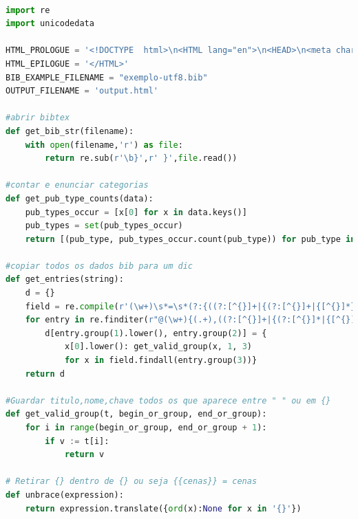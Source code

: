 \documentclass[11pt,a4paper]{report}
\begin{document}
\begin{lstlisting}[language=python]

import re
import unicodedata

HTML_PROLOGUE = '<!DOCTYPE  html>\n<HTML lang="en">\n<HEAD>\n<meta charset="utf-8">\n      <TITLE>Categories in BibTeX</TITLE>\n <script type="text/x-mathjax-config"> MathJax.Hub.Config({"extensions":["tex2jax.js"],"jax":["input/TeX","output/HTML-CSS"],"messageStyle":"none","tex2jax":{"processEnvironments":false,"processEscapes":true,"inlineMath":[["$","$"],["\\(","\\)"]],"displayMath":[["$$","$$"],["\\[","\\]"]]},"TeX":{"extensions":["AMSmath.js","AMSsymbols.js","noErrors.js","noUndefined.js"]},"HTML-CSS":{"availableFonts":["TeX"]}}); </script> <script type="text/javascript" async src="file:////home/useralef/.vscode/extensions/shd101wyy.markdown-preview-enhanced-0.6.1/node_modules/@shd101wyy/mume/dependencies/mathjax/MathJax.js" charset="UTF-8"></script>  </HEAD>\n'
HTML_EPILOGUE = '</HTML>'
BIB_EXAMPLE_FILENAME = "exemplo-utf8.bib"
OUTPUT_FILENAME = 'output.html'

#abrir bibtex
def get_bib_str(filename):
    with open(filename,'r') as file:
        return re.sub(r'\b}',r' }',file.read())

#contar e enunciar categorias
def get_pub_type_counts(data):
    pub_types_occur = [x[0] for x in data.keys()]
    pub_types = set(pub_types_occur)
    return [(pub_type, pub_types_occur.count(pub_type)) for pub_type in pub_types]

#copiar todos os dados bib para um dic
def get_entries(string):
    d = {}
    field = re.compile(r'(\w+)\s*=\s*(?:{((?:[^{}]+|{(?:[^{}]+|{[^{}]*})+})+)}|"([^"]+)"|(\d+))')
    for entry in re.finditer(r"@(\w+){(.+),((?:[^{}]+|{(?:[^{}]*|{[^{}]*})+})+)", string):
        d[entry.group(1).lower(), entry.group(2)] = {
            x[0].lower(): get_valid_group(x, 1, 3)
            for x in field.findall(entry.group(3))}
    return d

#Guardar titulo,nome,chave todos os que aparece entre " " ou em {}
def get_valid_group(t, begin_or_group, end_or_group):
    for i in range(begin_or_group, end_or_group + 1):
        if v := t[i]:
            return v

# Retirar {} dentro de {} ou seja {{cenas}} = cenas
def unbrace(expression):
    return expression.translate({ord(x):None for x in '{}'})


\end{lstlisting}
\end{document}

